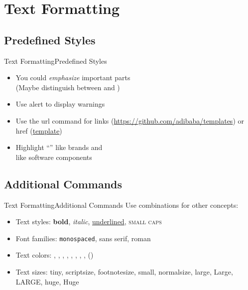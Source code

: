 \documentclass{beamer}
\begin{document}
\section{Text Formatting}
\subsection{Predefined Styles}
\begin{frame}{Text Formatting}{Predefined Styles}
	\begin{itemize}
		\item You could \emph{emphasize} important parts \\(Maybe distinguish between  and )
		\item Use alert to display \alert{warnings}
		\item Use the url command for links (\url{https://github.com/adibaba/templates}) or href (\href{https://github.com/adibaba/templates}{template})
		\item Highlight ``'' like brands and\\  like software components
	\end{itemize}
\end{frame}

\subsection{Additional Commands}
\begin{frame}{Text Formatting}{Additional Commands}
	Use combinations for other concepts:
	\begin{itemize}
		\item Text styles: \textbf{bold}, \textit{italic}, \underline{underlined}, \textsc{small caps}
		\item Font families: \texttt{monospaced}, \textsf{sans serif}, \textrm{roman}
		\item Text colors: , , , , , , , , ()
		\item Text sizes: {\tiny tiny}, {\scriptsize scriptsize}, {\footnotesize footnotesize}, {\small small}, {\normalsize normalsize}, {\large large}, {\Large Large}, {\LARGE LARGE}, {\huge huge}, {\Huge Huge}
	\end{itemize}
\end{frame}
\end{document}
